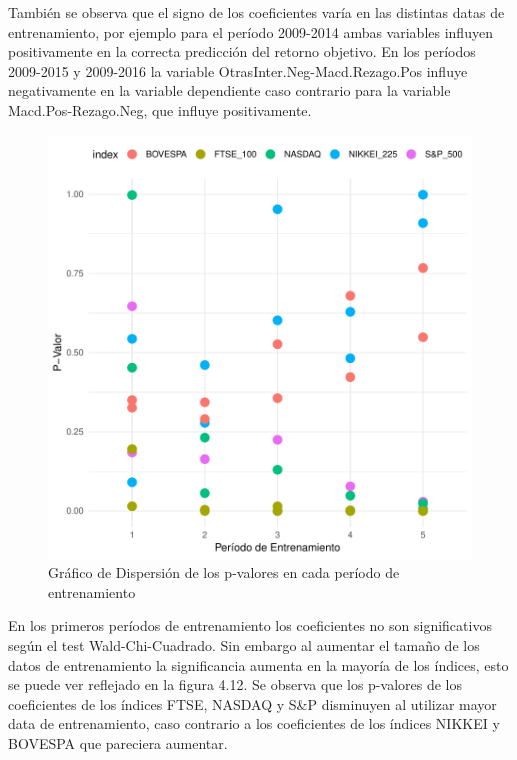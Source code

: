 \documentclass[a4paper,12pt]{Latex/Classes/PhDthesisPSnPDF}
\begin{document}
También se observa que el signo de los coeficientes varía en las distintas datas de entrenamiento, por ejemplo para el período 2009-2014 ambas variables influyen positivamente en la correcta predicción del retorno objetivo. En los períodos 2009-2015 y 2009-2016 la variable OtrasInter.Neg-Macd.Rezago.Pos influye negativamente en la variable dependiente caso contrario para la variable Macd.Pos-Rezago.Neg, que influye positivamente.


\begin{figure}[H]
\centering
\includegraphics{main-026}
\caption{Gráfico de Dispersión de los p-valores en cada período de entrenamiento}
\end{figure}

En los primeros períodos de entrenamiento los coeficientes no son significativos según el test Wald-Chi-Cuadrado. Sin embargo al aumentar el tamaño de los datos de entrenamiento la significancia aumenta en la mayoría de los índices, esto se puede ver reflejado en la figura 4.12. Se observa que los p-valores de los coeficientes de los índices FTSE, NASDAQ y S\&P disminuyen al utilizar mayor data de entrenamiento, caso contrario a los coeficientes de los índices NIKKEI y BOVESPA que pareciera aumentar.
\end{document}
